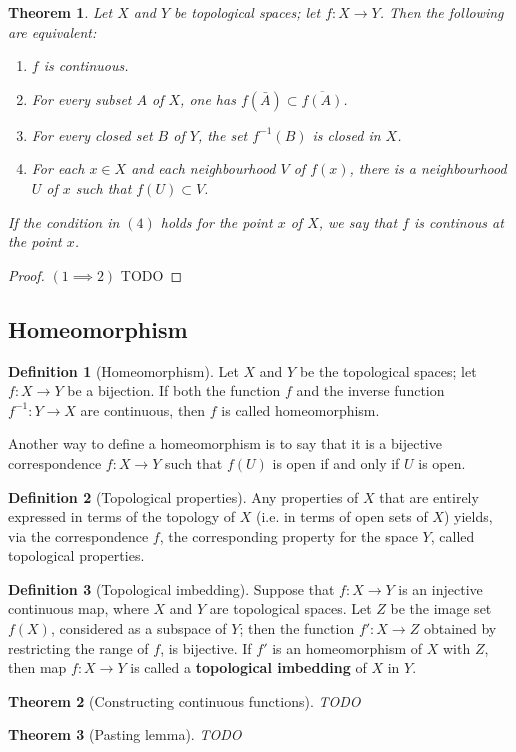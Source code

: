 \documentclass[12pt,reqno]{amsart}
\theoremstyle{plain}
\newtheorem{thm}{Theorem}
\theoremstyle{definition}
\newtheorem{defn}{Definition}
\begin{document}
\begin{thm}
    Let $X$ and $Y$ be topological spaces; let $f:X \to Y$. Then the following are equivalent:
    \begin{enumerate}
        \item $f$ is continuous.
        \item For every subset $A$ of $X$, one has $f(\bar{A})\subset \overline{f(A)}$.
        \item For every closed set $B$ of $Y$, the set $f^{-1}(B)$ is closed in $X$.
        \item For each $x\in X$ and each neighbourhood $V$ of $f(x)$, there is a neighbourhood $U$ of $x$ such that $f(U) \subset V$.
    \end{enumerate}   
    If the condition in $(4)$ holds for the point $x$ of $X$, we say that $f$ is continous at the point $x$.
\end{thm}
\begin{proof}
    $(1 \implies 2)$ TODO
\end{proof}

\subsection{Homeomorphism}
\begin{defn}[Homeomorphism]
    Let $X$ and $Y$ be the topological spaces; let $f : X \to Y$ be a bijection. If both the function $f$ and the inverse function $f^{-1}: Y \to X$ are continuous, then $f$ is called homeomorphism.
\end{defn}
Another way to define a homeomorphism is to say that it is a bijective correspondence $f: X \to Y$ such that $f(U)$ is open if and only if $U$ is open.
\begin{defn}[Topological properties]
    Any properties of $X$ that are entirely expressed in terms of the topology of $X$ (i.e. in terms of open sets of $X$) yields, via the correspondence $f$, the corresponding property for the space $Y$, called topological properties.
\end{defn}
\begin{defn}[Topological imbedding]
    Suppose that $f : X \to Y$ is an injective continuous map, where $X$ and $Y$ are topological spaces. Let $Z$ be the image set $f(X)$, considered as a subspace of $Y$; then the function $f' : X \to Z$ obtained by restricting the range of $f$, is bijective. If $f'$ is an homeomorphism of $X$ with $Z$, then map $f : X \to Y$ is  called a {\bf topological imbedding} of $X$ in $Y$.
\end{defn}
\begin{thm}[Constructing continuous functions]
    TODO
\end{thm}
\begin{thm}[Pasting lemma]
    TODO
\end{thm}
\end{document}
